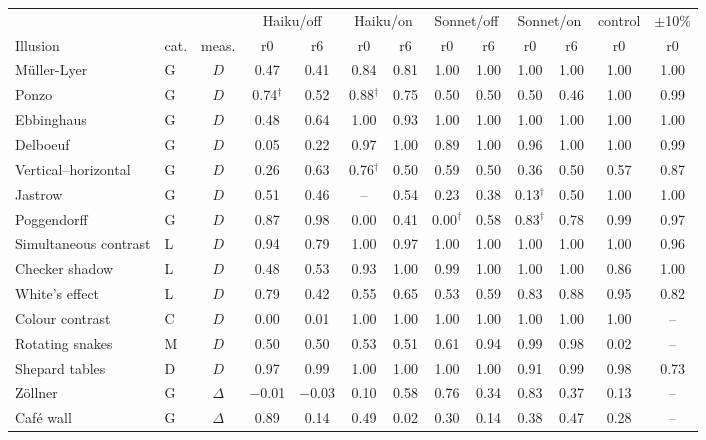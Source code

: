 \begin{tabular}{llccccccccccc}
\toprule
 & & & \multicolumn{2}{c}{Haiku/off} & \multicolumn{2}{c}{Haiku/on} & \multicolumn{2}{c}{Sonnet/off} & \multicolumn{2}{c}{Sonnet/on} & control & $\pm$10\% \\
\cmidrule(lr){4-5} \cmidrule(lr){6-7} \cmidrule(lr){8-9} \cmidrule(lr){10-11}
Illusion & cat. & meas. & r0 & r6 & r0 & r6 & r0 & r6 & r0 & r6 & r0 & r0 \\
\midrule
M\"uller-Lyer & G & $D$ & 0.47 & 0.41 & 0.84 & 0.81 & 1.00 & 1.00 & 1.00 & 1.00 & 1.00 & 1.00 \\
Ponzo & G & $D$ & 0.74$^\dagger$ & 0.52 & 0.88$^\dagger$ & 0.75 & 0.50 & 0.50 & 0.50 & 0.46 & 1.00 & 0.99 \\
Ebbinghaus & G & $D$ & 0.48 & 0.64 & 1.00 & 0.93 & 1.00 & 1.00 & 1.00 & 1.00 & 1.00 & 1.00 \\
Delboeuf & G & $D$ & 0.05 & 0.22 & 0.97 & 1.00 & 0.89 & 1.00 & 0.96 & 1.00 & 1.00 & 0.99 \\
Vertical--horizontal & G & $D$ & 0.26 & 0.63 & 0.76$^\dagger$ & 0.50 & 0.59 & 0.50 & 0.36 & 0.50 & 0.57 & 0.87 \\
Jastrow & G & $D$ & 0.51 & 0.46 & -- & 0.54 & 0.23 & 0.38 & 0.13$^\dagger$ & 0.50 & 1.00 & 1.00 \\
Poggendorff & G & $D$ & 0.87 & 0.98 & 0.00 & 0.41 & 0.00$^\dagger$ & 0.58 & 0.83$^\dagger$ & 0.78 & 0.99 & 0.97 \\
Simultaneous contrast & L & $D$ & 0.94 & 0.79 & 1.00 & 0.97 & 1.00 & 1.00 & 1.00 & 1.00 & 1.00 & 0.96 \\
Checker shadow & L & $D$ & 0.48 & 0.53 & 0.93 & 1.00 & 0.99 & 1.00 & 1.00 & 1.00 & 0.86 & 1.00 \\
White's effect & L & $D$ & 0.79 & 0.42 & 0.55 & 0.65 & 0.53 & 0.59 & 0.83 & 0.88 & 0.95 & 0.82 \\
Colour contrast & C & $D$ & 0.00 & 0.01 & 1.00 & 1.00 & 1.00 & 1.00 & 1.00 & 1.00 & 1.00 & -- \\
Rotating snakes & M & $D$ & 0.50 & 0.50 & 0.53 & 0.51 & 0.61 & 0.94 & 0.99 & 0.98 & 0.02 & -- \\
Shepard tables & D & $D$ & 0.97 & 0.99 & 1.00 & 1.00 & 1.00 & 1.00 & 0.91 & 0.99 & 0.98 & 0.73 \\
\midrule
Z\"ollner & G & $\Delta$ & $-$0.01 & $-$0.03 & 0.10 & 0.58 & 0.76 & 0.34 & 0.83 & 0.37 & 0.13 & -- \\
Caf\'e wall & G & $\Delta$ & 0.89 & 0.14 & 0.49 & 0.02 & 0.30 & 0.14 & 0.38 & 0.47 & 0.28 & -- \\

\end{tabular}
